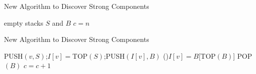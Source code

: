 \documentclass{beamer}
\begin{document}
\begin{frame}[fragile]{New Algorithm to Discover Strong Components}
	\SetAlFnt{\normalsize}
	\begin{procedure}[H]
		\caption{STRONG(G)}
		empty stacks $S$ and $B$\;
		$c=n$\;
	\end{procedure}
\end{frame}

\begin{frame}[fragile]{New Algorithm to Discover Strong Components}
	\SetAlFnt{\small}
	\begin{procedure}[H]
		\caption{DFS(v)}
		PUSH$(v,S)$;\quad $I[v]=$TOP$(S)$;\quad PUSH$(I[v],B)$\;
		\If(){$I[v]=B[$TOP$(B)]$} {
			POP$(B)$\;
			$c = c + 1$\;
		}
	\end{procedure}
\end{frame}
\end{document}
